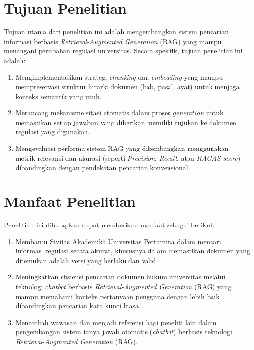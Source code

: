 \section{Tujuan Penelitian}
    Tujuan utama dari penelitian ini adalah mengembangkan sistem pencarian informasi berbasis \textit{Retrieval-Augmented Generation} (RAG) yang mampu menangani perubahan regulasi universitas. 
    Secara spesifik, tujuan penelitian ini adalah:
    \begin{enumerate}
        \item Mengimplementasikan strategi \textit{chunking} dan \textit{embedding} yang mampu mempreservasi struktur hirarki dokumen (bab, pasal, ayat) untuk menjaga konteks semantik yang utuh.

        \item Merancang mekanisme sitasi otomatis dalam proses \textit{generation} untuk memastikan setiap jawaban yang diberikan memiliki rujukan ke dokumen regulasi yang digunakan.

        \item Mengevaluasi performa sistem RAG yang dikembangkan menggunakan metrik relevansi dan akurasi (seperti \textit{Precision}, \textit{Recall}, atau \textit{RAGAS score}) dibandingkan dengan pendekatan pencarian konvensional.
    \end{enumerate}

\newpage

\section{Manfaat Penelitian}
Penelitian ini diharapkan dapat memberikan manfaat sebagai berikut:
\begin{enumerate}
    \item Membantu Sivitas Akademika Universitas Pertamina dalam mencari informasi regulasi secara akurat, khususnya dalam memastikan dokumen yang ditemukan adalah versi yang berlaku dan valid.

    \item Meningkatkan efisiensi pencarian dokumen hukum universitas melalui teknologi \textit{chatbot} berbasis \textit{Retrieval-Augmented Generation} (RAG) yang mampu memahami konteks pertanyaan pengguna dengan lebih baik dibandingkan pencarian kata kunci biasa.

    \item Menambah wawasan dan menjadi referensi bagi peneliti lain dalam pengembangan sistem tanya jawab otomatis (\textit{chatbot}) berbasis teknologi \textit{Retrieval-Augmented Generation} (RAG).
\end{enumerate}